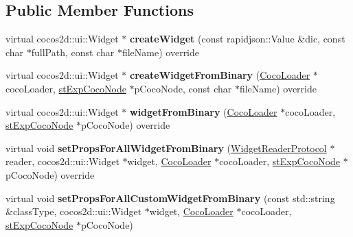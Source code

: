 \subsection*{Public Member Functions}
\begin{DoxyCompactItemize}
\item 
\mbox{\label{classcocostudio_1_1WidgetPropertiesReader0300_afc3b1f6de66fe352959f9c64654b69af}} 
virtual cocos2d\+::ui\+::\+Widget $\ast$ {\bfseries create\+Widget} (const rapidjson\+::\+Value \&dic, const char $\ast$full\+Path, const char $\ast$file\+Name) override
\item 
\mbox{\label{classcocostudio_1_1WidgetPropertiesReader0300_acb523db8710eb4a53cf827e660561b10}} 
virtual cocos2d\+::ui\+::\+Widget $\ast$ {\bfseries create\+Widget\+From\+Binary} (\hyperlink{classcocostudio_1_1CocoLoader}{Coco\+Loader} $\ast$coco\+Loader, \hyperlink{structcocostudio_1_1stExpCocoNode}{st\+Exp\+Coco\+Node} $\ast$p\+Coco\+Node, const char $\ast$file\+Name) override
\item 
\mbox{\label{classcocostudio_1_1WidgetPropertiesReader0300_a39cbd4142446230a7297677f1bcf6bb4}} 
virtual cocos2d\+::ui\+::\+Widget $\ast$ {\bfseries widget\+From\+Binary} (\hyperlink{classcocostudio_1_1CocoLoader}{Coco\+Loader} $\ast$coco\+Loader, \hyperlink{structcocostudio_1_1stExpCocoNode}{st\+Exp\+Coco\+Node} $\ast$p\+Coco\+Node) override
\item 
\mbox{\label{classcocostudio_1_1WidgetPropertiesReader0300_acb259a39c0e0a49dc66fc6453ac149ef}} 
virtual void {\bfseries set\+Props\+For\+All\+Widget\+From\+Binary} (\hyperlink{classcocostudio_1_1WidgetReaderProtocol}{Widget\+Reader\+Protocol} $\ast$reader, cocos2d\+::ui\+::\+Widget $\ast$widget, \hyperlink{classcocostudio_1_1CocoLoader}{Coco\+Loader} $\ast$coco\+Loader, \hyperlink{structcocostudio_1_1stExpCocoNode}{st\+Exp\+Coco\+Node} $\ast$p\+Coco\+Node) override
\item 
\mbox{\label{classcocostudio_1_1WidgetPropertiesReader0300_a12e4c6582df95ef02b93b929ac11abe4}} 
virtual void {\bfseries set\+Props\+For\+All\+Custom\+Widget\+From\+Binary} (const std\+::string \&class\+Type, cocos2d\+::ui\+::\+Widget $\ast$widget, \hyperlink{classcocostudio_1_1CocoLoader}{Coco\+Loader} $\ast$coco\+Loader, \hyperlink{structcocostudio_1_1stExpCocoNode}{st\+Exp\+Coco\+Node} $\ast$p\+Coco\+Node)

\end{DoxyCompactItemize}
